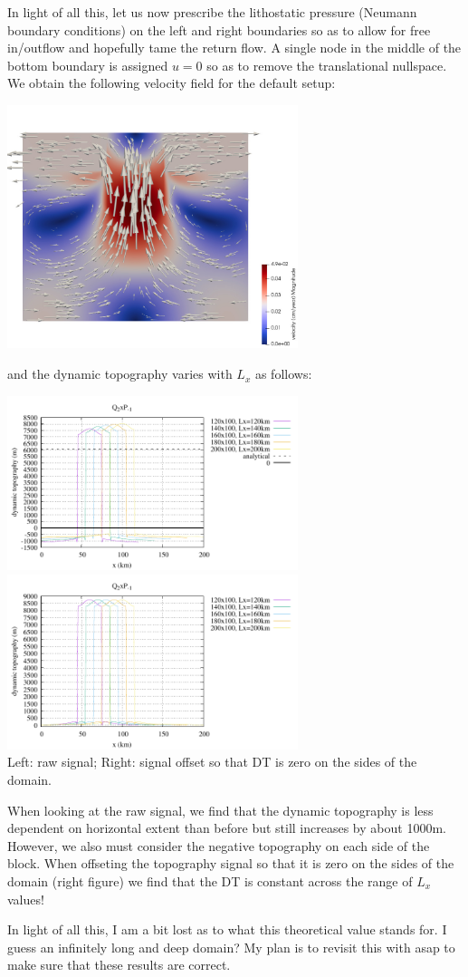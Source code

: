 In light of all this, let us now prescribe the lithostatic pressure (Neumann boundary conditions)
on the left and right boundaries so as to allow for free in/outflow and hopefully tame the 
return flow. A single node in the middle of the bottom boundary is assigned $u=0$ so as 
to remove the translational nullspace. We obtain the following velocity field 
for the default setup:
\begin{center}
\includegraphics[width=8.5cm]{python_codes/fieldstone_160/results/neumann/velN}
\end{center}
and the dynamic topography varies with $L_x$ as follows:
\begin{center}
\includegraphics[width=8.5cm]{python_codes/fieldstone_160/results/dyn_topo6.pdf}
\includegraphics[width=8.5cm]{python_codes/fieldstone_160/results/dyn_topo6b.pdf}\\
{\captionfont Left: raw signal; Right: signal offset so that DT is zero on the 
sides of the domain.}
\end{center}
When looking at the raw signal, we find that the dynamic topography is less dependent on horizontal extent than before
but still increases by about 1000m.
However, we also must consider the negative topography on each side of the block. 
When offseting the topography signal so that it is zero on the sides of the domain (right figure)
we find that the DT is constant across the range of $L_x$ values!

 
In light of all this, I am a bit lost as to what this theoretical value 
stands for. I guess an infinitely long and deep domain? 
My plan is to revisit this with \aspect asap to make sure that these results are correct.


